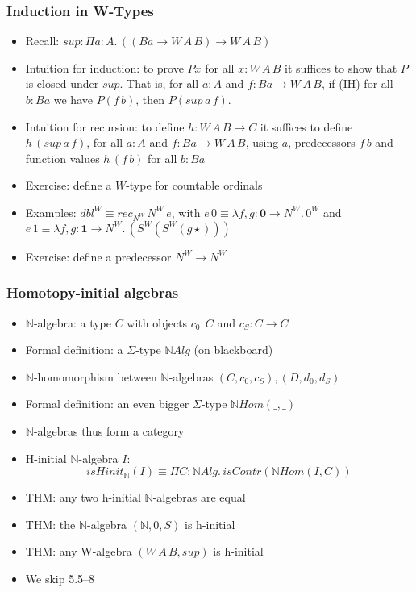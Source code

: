 \documentclass[handout]{beamer}
\newcommand{\depi}[3]{\Pi{#1{:}#2.\,#3}}
\newcommand{\lamt}[3]{\lambda{#1{:}#2.\,#3}}
\newcommand{\Nat}{\mathbb{N}}
\newcommand{\bfnull}{\mathbf{0}}
\newcommand{\bfone}{\mathbf{1}}
\begin{document}
\frame
  {
    \frametitle{Induction in W-Types}

    \begin{itemize}[<+->]
    \item Recall: $sup:\depi{a}{A}{((Ba\to W\,A\,B)\to W\,A\,B)}$
    \item Intuition for induction: to prove $Px$ for all $x:W\,A\,B$ it suffices
             to show that $P$ is closed under $sup$. 
             That is, for all $a:A$ and $f:Ba\to W\,A\,B$, 
             if (IH) for all $b:Ba$ we have $P(f\,b)$, 
             then $P(sup\,a\,f)$.
    \item Intuition for recursion: to define $h: W\,A\,B \to C$ 
             it suffices to define $h\,(sup\,a\,f)$, 
             for all $a:A$ and $f:Ba \to W\,A\,B$,
             using $a$, predecessors $f\,b$ and function values $h\,(f\,b)$ for all $b:Ba$
   \item Exercise: define a $W$-type for countable ordinals
    \item Examples: $dbl^W \equiv rec_{N^W}\,N^W\,e$, with
             $e\,0 \equiv \lamt{{f,g}}{\bfnull{\to} N^W}{0^W}$   
             and $e\,1 \equiv \lamt{{f,g}}{\bfone{\to} N^W}{(S^W(S^W (g\star) ))}$
    \item Exercise: define a predecessor $N^W \to N^W$         
    \end{itemize}
  }      
 
 
 \frame
  {
    \frametitle{Homotopy-initial algebras}

    \begin{itemize}[<+->]
    \item $\Nat$-algebra: a type $C$ with objects $c_0:C$ and $c_S: C\to C$
    \item Formal definition: a $\Sigma$-type $\Nat Alg$ (on blackboard)
    \item $\Nat$-homomorphism between $\Nat$-algebras $(C,c_0,c_S),(D,d_0,d_S)$
    \item Formal definition: an even bigger $\Sigma$-type $\Nat Hom(\_,\_)$
    \item $\Nat$-algebras thus form a category
    \item H-initial $\Nat$-algebra $I$: 
    \[isHinit_{\Nat}(I) \equiv \depi{C}{\Nat Alg}{isContr(\Nat Hom(I,C))}\]
    \item THM: any two h-initial $\Nat$-algebras are equal
    \item THM: the $\Nat$-algebra $(\Nat,0,S)$ is h-initial
    \item THM: any W-algebra $(W\,A\,B,sup)$ is h-initial
    \item We skip 5.5--8
    \end{itemize}
  }      
\end{document}
